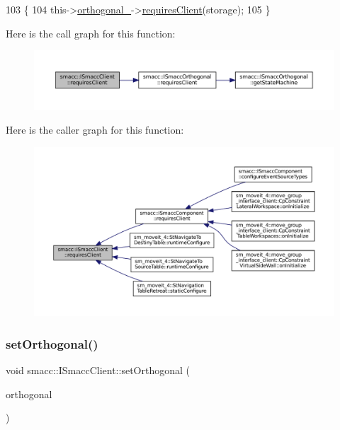 \begin{DoxyCode}
103     \{
104         this->\hyperlink{classsmacc_1_1ISmaccClient_a571c7f672d9c90128b5498aefc27c136}{orthogonal\_}->\hyperlink{classsmacc_1_1ISmaccOrthogonal_a602e16b09f8a1b3de889f2f3d90a3211}{requiresClient}(storage);
105     \}
\end{DoxyCode}
Here is the call graph for this function\+:
\nopagebreak
\begin{figure}[H]
\begin{center}
\leavevmode
\includegraphics[width=350pt]{classsmacc_1_1ISmaccClient_a7a9990a2f3e35d547671188d69fee520_cgraph}
\end{center}
\end{figure}
Here is the caller graph for this function\+:
\nopagebreak
\begin{figure}[H]
\begin{center}
\leavevmode
\includegraphics[width=350pt]{classsmacc_1_1ISmaccClient_a7a9990a2f3e35d547671188d69fee520_icgraph}
\end{center}
\end{figure}
\mbox{\label{classsmacc_1_1ISmaccClient_a40330788a976dc08e2f726d210564ec4}} 
\subsubsection{\texorpdfstring{set\+Orthogonal()}{setOrthogonal()}}
{\footnotesize\ttfamily void smacc\+::\+I\+Smacc\+Client\+::set\+Orthogonal (\begin{DoxyParamCaption}\item[{\hyperlink{classsmacc_1_1ISmaccOrthogonal}{I\+Smacc\+Orthogonal} $\ast$}]{orthogonal }\end{DoxyParamCaption})\hspace{0.3cm}{\ttfamily [protected]}}



